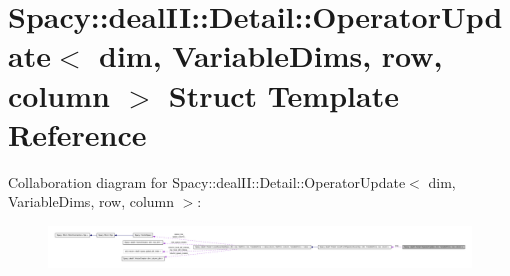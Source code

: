 \hypertarget{structSpacy_1_1dealII_1_1Detail_1_1OperatorUpdate}{\section{\-Spacy\-:\-:deal\-I\-I\-:\-:\-Detail\-:\-:\-Operator\-Update$<$ dim, \-Variable\-Dims, row, column $>$ \-Struct \-Template \-Reference}
\label{structSpacy_1_1dealII_1_1Detail_1_1OperatorUpdate}
}


\-Collaboration diagram for \-Spacy\-:\-:deal\-I\-I\-:\-:\-Detail\-:\-:\-Operator\-Update$<$ dim, \-Variable\-Dims, row, column $>$\-:
\nopagebreak
\begin{figure}[H]
\begin{center}
\leavevmode
\includegraphics[width=350pt]{structSpacy_1_1dealII_1_1Detail_1_1OperatorUpdate__coll__graph}
\end{center}
\end{figure}

